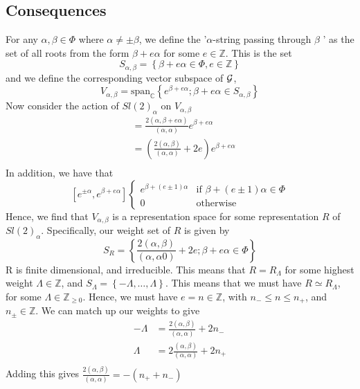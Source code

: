 \subsection{Consequences} 
For any $ \alpha , \beta \in \Phi  $ where  $ \alpha \neq \pm  \beta $, 
we define the '$ \alpha $-string passing through $ \beta $ ' 
as the set of all 
roots from the form $ \beta + e \alpha $ for some
$ e \in \mathbb{ Z} $. This is the set 
\[
	S_{ \alpha, \beta } = \left\{  \beta + e \alpha  \in \Phi , e \in \mathbb{ Z}  \right\} 
\] and we define the corresponding vector subspace of $ \mathcal{ G } $, 
\[
	V _{ \alpha, \beta } = \text{span} _{ \mathbb{ C} } \left\{  
	e ^{ \beta + e \alpha} ; \beta + e \alpha \in S_{ \alpha , \beta }\right\} 
\] 
Now consider the action of $ Sl ( 2) _{ \alpha } $ on 
$ V_{ \alpha, \beta } $ 
\begin{align*}
	[ h ^ \alpha, e ^{ \beta + e \alpha } ] &=  \frac{ 2 ( \alpha, \beta + e \alpha ) }{ 
	\left(  \alpha, \alpha  \right)  } e ^{ \beta + e \alpha }  \\
						&=  \left(  \frac{2 ( \alpha , \beta ) }{ ( \alpha, \alpha ) } 
						+ 2 e \right)  e ^{ \beta + e \alpha }  \\
\end{align*}
In addition, we have that 
\[
	[ e ^{ \pm \alpha } , e ^{ \beta + e \alpha} ] \begin{cases}
		e ^{ \beta + ( e \pm 1 ) \alpha } & \text{if } \beta + ( e \pm 1 ) \alpha \in \Phi \\
		0 & \text{otherwise}
	\end{cases}
\]  
Hence, we find that $ V_{ \alpha, \beta } $ is a representation 
space for some representation $ R $ of $ Sl ( 2 )_ \alpha $. 
Specifically, our weight set of $ R $  is given by 
\[
	S_{ R }  = \left\{  \frac{2 ( \alpha, \beta ) }{ ( \alpha, \alpha 0 ) } +  2 e ; 
	\beta + e \alpha \in \Phi \right\} 
\] R is finite dimensional, and irreducible.
This means that $ R  =R _{ \Lambda } $ for 
some highest weight $ \Lambda \in \mathbb{ Z} $, and 
$ S _{ \Lambda }  = \left\{   - \Lambda , \dots, \Lambda  \right\}  $. 
This means that we must have $ R \simeq R_{\Lambda } $,
for some $ \Lambda \in \mathbb{ Z} _{ \geq 0  } $. 
Hence, we must have $ e = n \in \mathbb{ Z} $, with 
$ n _ - \leq n \leq n _ + $, and $ n_{ \pm } \in \mathbb{ Z} $. 
We can match up our weights to give 
\begin{align*}
	- \Lambda &  = \frac{ 2 ( \alpha , \beta ) }{ ( \alpha, \alpha ) } + 2 n_ - \\
	\Lambda &=   2 \frac{ ( \alpha, \beta ) }{ ( \alpha, \alpha )   } + 2 n _ +   \\
\end{align*}
Adding this gives $ \frac{ 2 ( \alpha , \beta ) }{ ( \alpha , \alpha ) }  = - ( n _ + + n _ - ) $

